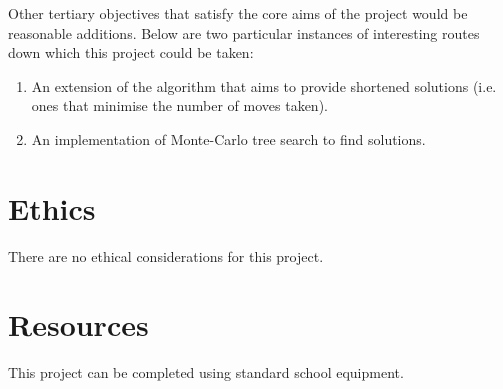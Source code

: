 \documentclass{article}
\begin{document}
Other tertiary objectives that satisfy the core aims of the project would be
reasonable additions. Below are two particular instances of interesting routes
down which this project could be taken:

\begin{enumerate}
	\item An extension of the algorithm that aims to provide shortened solutions
		(i.e. ones that minimise the number of moves taken).
	\item An implementation of Monte-Carlo tree search\cite{WikMCTS} to find
		solutions.
\end{enumerate}

\section{Ethics}

There are no ethical considerations for this project.

\section{Resources}

This project can be completed using standard school equipment.

\printbibliography
\end{document}
